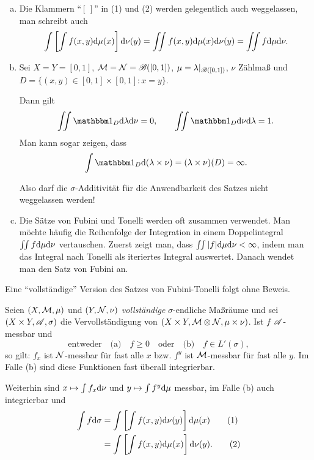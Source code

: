 \begin{rmrk}
 \begin{enumerate}[(a)]
  \item Die Klammern ``$[\,]$'' in (1) und (2) werden gelegentlich auch
    weggelassen, man schreibt auch 
   \[ \int \left[ \int f(x,y) \mathrm{d} \mu(x) \right] \mathrm{d} \nu(y) 
      = \iint f(x,y) \mathrm{d} \mu(x) \mathrm{d} \nu(y)
      = \iint f \mathrm{d} \mu \mathrm{d} \nu. \]
  \item Sei $X = Y = [0,1]$, $\mathcal{M} = \mathcal{N} = \mathscr{B}([0,1])$, $\mu = \lambda
    |_{\mathscr{B}([0,1])}$, $\nu$ Zählmaß und $D = \{ (x,y) \in [0,1] \times [0,1] :
    x = y  \}$. 
  
  Dann gilt 
  \[ \iint \ind_D \diffop \lambda \diffop \nu = 0, \qquad \iint \ind_D \diffop \nu \diffop \lambda = 1. \]
  Man kann sogar zeigen, dass
  \[ \int \ind_D \diffop (\lambda \times \nu) = (\lambda \times \nu)(D) = \infty. \]
  
  Also darf die $\sigma$-Additivität für die Anwendbarkeit des Satzes nicht
  weggelassen werden! 
  \item Die Sätze von Fubini und Tonelli werden oft zusammen verwendet. Man
    möchte häufig die Reihenfolge der Integration in einem Doppelintegral $\iint
    f  \mathrm{d} \mu \mathrm{d} \nu$ vertauschen. Zuerst zeigt man, dass $\iint |f|
    \mathrm{d} \mu \mathrm{d} \nu < \infty$, indem man das Integral nach Tonelli als
    iteriertes Integral auswertet. Danach wendet man den Satz von Fubini an. 
 \end{enumerate}
\end{rmrk}

Eine ``vollständige'' Version des Satzes von Fubini-Tonelli folgt ohne Beweis.
\begin{thm}
 Seien $(X, \mathcal{M}, \mu)$ und $(Y, \mathcal{N}, \nu)$ \emph{vollständige} $\sigma$-endliche Maßräume und sei $(X \times Y, \mathscr{A}, \sigma)$ die Vervollständigung von $(X \times Y, \mathcal{M} \otimes \mathcal{N}, \mu \times \nu)$. Ist $f$ $\mathscr{A}$-messbar und 
 \[ \text{entweder} \quad \text{(a)} \quad f \ge 0 \quad \text{oder} \quad \text{(b)} \quad f \in L'(\sigma), \] 
 so gilt: $f_x$ ist $\mathcal{N}$-messbar für fast alle $x$ bzw. $f^y$ ist $\mathcal{M}$-messbar für fast alle $y$. Im Falle (b) sind diese Funktionen fast überall integrierbar.
 
 Weiterhin sind $x \mapsto \int f_x \mathrm{d} \nu$ und $y \mapsto \int f^y \mathrm{d} \mu$ messbar, im Falle (b) auch integrierbar und
 \begin{align*}
  \int f \mathrm{d} \sigma
  &= \int \left[ \int f(x,y) \mathrm{d} \nu(y) \right] \mathrm{d} \mu(x) \tag{1}\\
  &= \int \left[ \int f(x,y) \mathrm{d} \mu(x) \right] \mathrm{d} \nu(y). \tag{2}
 \end{align*}
\end{thm}

